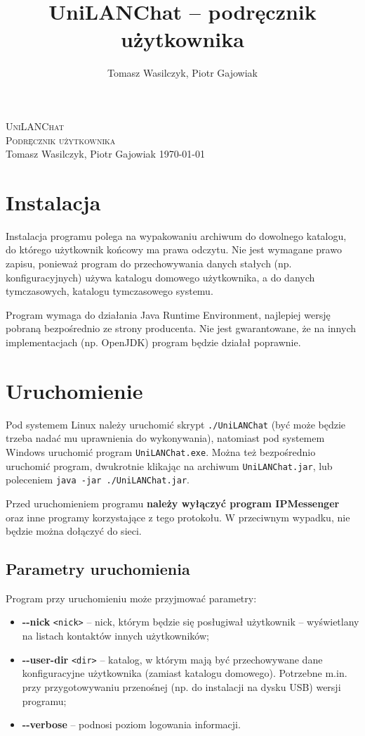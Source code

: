 \documentclass[11pt,leqno]{article}
\author{Tomasz Wasilczyk, Piotr Gajowiak}
\title{UniLANChat -- podręcznik użytkownika}
\begin{document}
\begin{titlepage}
\begin{center}
	\vspace*{6cm}
	\textsc{\LARGE UniLANChat}\\[0.25cm]
	\textsc{\Large Podręcznik użytkownika}\\[1cm]
	Tomasz Wasilczyk, Piotr Gajowiak
	\vfill
	\today
\end{center}
\end{titlepage}

\tableofcontents

\section{Instalacja}

Instalacja programu polega na wypakowaniu archiwum do dowolnego katalogu, do którego użytkownik
końcowy ma prawa odczytu. Nie jest wymagane prawo zapisu, ponieważ program do przechowywania danych
stałych (np. konfiguracyjnych) używa katalogu domowego użytkownika, a do danych tymczasowych,
katalogu tymczasowego systemu.

Program wymaga do działania Java Runtime Environment, najlepiej wersję pobraną bezpośrednio ze
strony producenta. Nie jest gwarantowane, że na innych implementacjach (np. OpenJDK) program będzie 
działał poprawnie.

\section{Uruchomienie}

Pod systemem Linux należy uruchomić skrypt \texttt{./UniLANChat} (być może będzie trzeba nadać mu
uprawnienia do wykonywania), natomiast pod systemem Windows uruchomić program \texttt{UniLANChat.exe}.
Można też bezpośrednio uruchomić program, dwukrotnie klikając na archiwum \texttt{UniLANChat.jar},
lub poleceniem \texttt{java -jar ./UniLANChat.jar}.

Przed uruchomieniem programu \textbf{należy wyłączyć program IPMessenger} oraz inne programy
korzystające z tego protokołu. W przeciwnym wypadku, nie będzie można dołączyć do sieci.

\subsection{Parametry uruchomienia}\label{sec:parameters}

Program przy uruchomieniu może przyjmować parametry:
\begin{itemize}
	\item \textbf{-\--nick} \texttt{<nick>} -- nick, którym będzie się posługiwał użytkownik --
	wyświetlany na listach kontaktów innych użytkowników;
	\item \textbf{-\--user-dir} \texttt{<dir>} -- katalog, w którym mają być przechowywane dane
	konfiguracyjne użytkownika (zamiast katalogu domowego). Potrzebne m.in. przy przygotowywaniu
	przenośnej (np. do instalacji na dysku USB) wersji programu;
	\item \textbf{-\--verbose} -- podnosi poziom logowania informacji.
\end{itemize}
\end{document}
